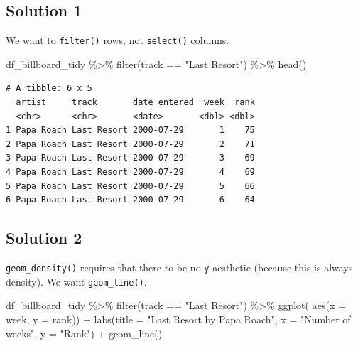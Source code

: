 \documentclass[
  letterpaper,
  DIV=11]{scrartcl}
\newenvironment{Shaded}{\begin{snugshade}}{\end{snugshade}}
\newcommand{\AttributeTok}[1]{\textcolor[rgb]{0.40,0.45,0.13}{#1}}
\newcommand{\FunctionTok}[1]{\textcolor[rgb]{0.28,0.35,0.67}{#1}}
\newcommand{\NormalTok}[1]{\textcolor[rgb]{0.00,0.23,0.31}{#1}}
\newcommand{\SpecialCharTok}[1]{\textcolor[rgb]{0.37,0.37,0.37}{#1}}
\newcommand{\StringTok}[1]{\textcolor[rgb]{0.13,0.47,0.30}{#1}}
\begin{document}
\subsection{Solution 1}

We want to \texttt{filter()} rows, not \texttt{select()} columns.

\begin{Shaded}
\begin{Highlighting}[numbers=left,,]
\NormalTok{df\_billboard\_tidy }\SpecialCharTok{\%\textgreater{}\%}
  \FunctionTok{filter}\NormalTok{(track }\SpecialCharTok{==} \StringTok{"Last Resort"}\NormalTok{) }\SpecialCharTok{\%\textgreater{}\%} 
  \FunctionTok{head}\NormalTok{()}
\end{Highlighting}
\end{Shaded}

\begin{verbatim}
# A tibble: 6 x 5
  artist     track       date_entered  week  rank
  <chr>      <chr>       <date>       <dbl> <dbl>
1 Papa Roach Last Resort 2000-07-29       1    75
2 Papa Roach Last Resort 2000-07-29       2    71
3 Papa Roach Last Resort 2000-07-29       3    69
4 Papa Roach Last Resort 2000-07-29       4    69
5 Papa Roach Last Resort 2000-07-29       5    66
6 Papa Roach Last Resort 2000-07-29       6    64
\end{verbatim}

\subsection{Solution 2}

\texttt{geom\_density()} requires that there to be no \texttt{y}
aesthetic (because this is always density). We want
\texttt{geom\_line()}.

\begin{Shaded}
\begin{Highlighting}[numbers=left,,]
\NormalTok{df\_billboard\_tidy }\SpecialCharTok{\%\textgreater{}\%}
  \FunctionTok{filter}\NormalTok{(track }\SpecialCharTok{==} \StringTok{"Last Resort"}\NormalTok{) }\SpecialCharTok{\%\textgreater{}\%} 
\FunctionTok{ggplot}\NormalTok{(}
  \FunctionTok{aes}\NormalTok{(}\AttributeTok{x =}\NormalTok{ week, }\AttributeTok{y =}\NormalTok{ rank)) }\SpecialCharTok{+}
  \FunctionTok{labs}\NormalTok{(}\AttributeTok{title =} \StringTok{"\textquotesingle{}Last Resort\textquotesingle{} by Papa Roach"}\NormalTok{,}
       \AttributeTok{x =} \StringTok{"Number of weeks"}\NormalTok{, }\AttributeTok{y =} \StringTok{"Rank"}\NormalTok{) }\SpecialCharTok{+}
  \FunctionTok{geom\_line}\NormalTok{()}
\end{Highlighting}
\end{Shaded}
\end{document}
